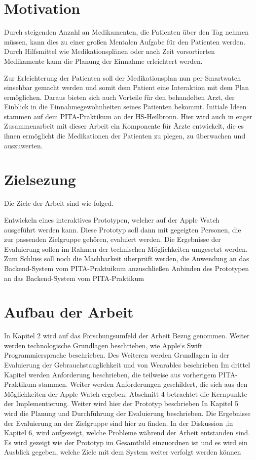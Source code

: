 \section{Motivation}
Durch steigenden Anzahl an Medikamenten, die Patienten über den Tag nehmen müssen, kann dies zu einer großen Mentalen Aufgabe für den Patienten werden. Durch Hilfsmittel wie Medikationsplänen oder nach Zeit vorsortierten Medikamente kann die Planung der Einnahme erleichtert werden. 

Zur Erleichterung der Patienten soll der Medikationsplan nun per Smartwatch einsehbar gemacht werden und somit dem Patient eine Interaktion mit dem Plan ermöglichen. Daraus bieten sich auch Vorteile für den behandelten Arzt, der Einblick in die Einnahmegewohnheiten seines Patienten bekommt. Initiale Ideen stammen auf dem PITA-Praktikum an der HS-Heilbronn. Hier wird auch in enger Zusammenarbeit mit dieser Arbeit ein Komponente für Ärzte entwickelt, die es ihnen ermöglicht die Medikationen der Patienten zu plegen, zu überwachen und auszuwerten.
\section{Zielsezung}
Die Ziele der Arbeit sind wie folged.

Entwickeln eines interaktives Prototypen, welcher auf der Apple Watch ausgeführt werden kann. Diese Prototyp soll dann mit gegeigten Personen, die zur passenden Zielgruppe gehören, evaluiert werden.
Die Ergebnisse der Evaluierung sollen im Rahmen der technischen Möglichkeiten umgesetzt werden. Zum Schluss soll noch die Machbarkeit überprüft werden, die Anwendung an das Backend-System vom PITA-Praktuikum anzuschließen
Anbinden des Prototypen an das Backend-System vom PITA-Praktikum

\section{Aufbau der Arbeit}

In Kapitel 2 wird auf das Forschungsumfeld der Arbeit Bezug genommen. Weiter werden technologische Grundlagen beschrieben, wie Apple`s Swift Programmiersprache beschrieben. Des Weiteren werden Grundlagen in der Evaluierung der Gebrauchstauglichkeit und von Wearables beschrieben
Im drittel Kapitel werden Anforderung beschrieben, die teilweise aus vorherigem PITA-Praktikum stammen. Weiter werden Anforderungen geschildert, die sich aus den Möglichkeiten der Apple Watch ergeben.
Abschnitt 4 betrachtet die Kernpunkte der Implementierung. Weiter wird hier der Prototyp beschrieben
In Kapitel 5 wird die Planung und Durchführung der Evaluierung beschrieben. Die  Ergebnisse der Evaluierung an der Zielgruppe sind hier zu finden.
In der Diskussion ,in Kapitel 6, wird aufgezeigt, welche Probleme während der Arbeit entstanden sind. Es wird gezeigt wie der Prototyp im Gesamtbild einzuordnen ist und es wird ein Ausblick gegeben, welche Ziele mit dem System weiter verfolgt werden können

